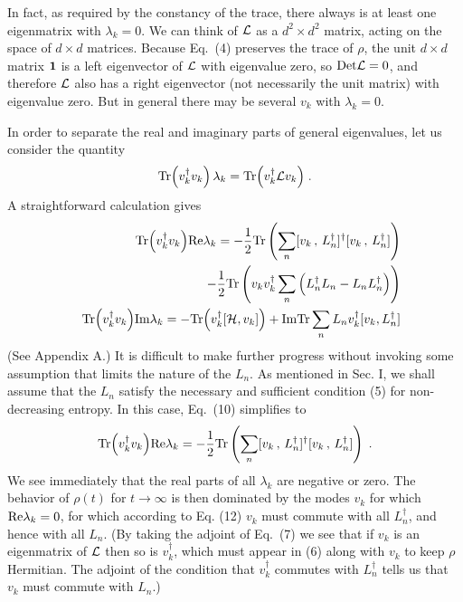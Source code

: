 In fact, as required by the constancy of the trace, there always is at least one eigenmatrix with $\lambda_k=0$.  We can think of ${\cal L}$ as a $d^2\times d^2$ matrix, acting on the space of $d\times d$ matrices.  Because Eq.~(4) preserves the trace of $\rho$, the unit $d\times d$ matrix ${\mbox{\boldmath{$1$}}}$ is a left eigenvector of ${\cal L}$ with eigenvalue zero, so ${\rm Det}{\cal L}=0$, and therefore ${\cal L}$ also has a right eigenvector (not necessarily the unit matrix) with eigenvalue zero.  But in general there may be several  $v_k$ with $\lambda_k=0$.

In order to separate the real and imaginary parts of general eigenvalues, let us consider the quantity
\begin{equation}
{\rm Tr}\Big(v_k^\dagger v_k\Big)\,\lambda_k= {\rm Tr}\Big(v_k^\dagger {\cal L}v_k\Big)\;.
\end{equation}
A straightforward calculation gives
\begin{eqnarray}
&&{\rm Tr}\Big(v_k^\dagger v_k\Big){\rm Re}\lambda_k=-\frac{1}{2}{\rm Tr}\left(\sum_n [v_k\,,\,L_n^\dagger]^\dagger[v_k\,,\,L_n^\dagger]\right)\nonumber\\&&
~~~~~-\frac{1}{2}{\rm Tr}\left(v_k v_k^\dagger \sum_n\Big(L_n^\dagger L_n-L_n L_n^\dagger\Big)\right)\\
&&{\rm Tr}\Big(v_k^\dagger v_k\Big){\rm Im}\lambda_k=-{\rm Tr}\Big(v_k^\dagger [{\cal H},v_k]\Big)
+{\rm Im}{\rm Tr}\sum_n L_nv_k^\dagger[v_k,L_n^\dagger ]\end{eqnarray}
(See Appendix A.)  
It is difficult to make further progress without invoking some assumption that limits the nature of the $L_n$.  As mentioned in Sec. I, we shall assume that the $L_n$ satisfy the necessary and sufficient condition (5) for non-decreasing entropy.  In this case, Eq.~(10) simplifies to 
\begin{equation}
{\rm Tr}\Big(v_k^\dagger v_k\Big){\rm Re}\lambda_k=-\frac{1}{2}{\rm Tr}\left(\sum_n [v_k\,,\,L_n^\dagger]^\dagger[v_k\,,\,L_n^\dagger]\right)\;.
\end{equation}
We see immediately that  the real parts of all $\lambda_k$ are negative or zero.  The behavior of $\rho(t)$ for $t\rightarrow\infty$ is then dominated by the modes $v_k$ for which ${\rm Re}\lambda_k=0$, for which according to Eq. (12) $v_k$ must commute with all $L^\dagger_n$, and hence with all $L_n$.  (By taking the adjoint of Eq.~(7) we see that if $v_k$ is an eigenmatrix of ${\cal L}$ then so is $v_k^\dagger$, which must appear in (6) along with $v_k$ to keep $\rho$ Hermitian.  The adjoint of the condition that $v_k^\dagger$ commutes with $L_n^\dagger$ tells us that $v_k$ must commute with $L_n$.)  

